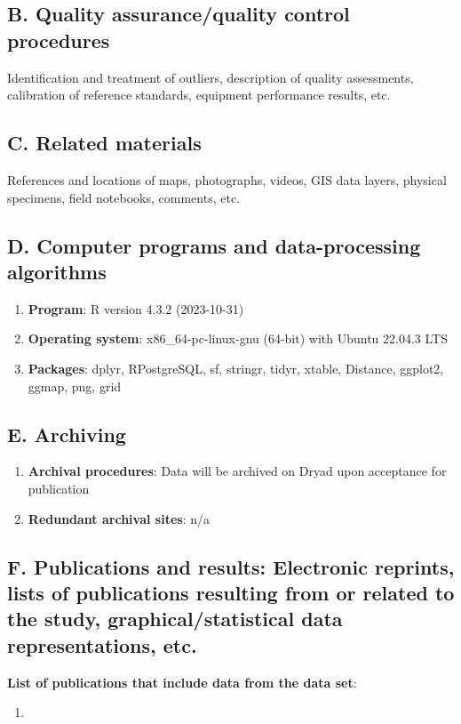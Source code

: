 \documentclass[a4paper,twoside,10pt]{article}
\begin{document}
    \subsection*{B. Quality assurance/quality control procedures}Identification and treatment of outliers, description of quality assessments, calibration of reference standards, equipment performance results, etc.
    \subsection*{C. Related materials} References and locations of maps, photographs, videos, GIS data layers, physical specimens, field notebooks, comments, etc.
    \subsection*{D. Computer programs and data-processing algorithms}
    		\begin{enumerate}
    			\item \textbf{Program}: R version 4.3.2 (2023-10-31)
    			\item \textbf{Operating system}: x86\_64-pc-linux-gnu (64-bit) with Ubuntu 22.04.3 LTS
    			\item \textbf{Packages}: dplyr, RPostgreSQL, sf, stringr, tidyr, xtable, Distance, ggplot2, ggmap, png, grid
    		\end{enumerate}
    \subsection*{E. Archiving}
    		\begin{enumerate}
    		 \item \textbf{Archival procedures}: Data will be archived on Dryad upon acceptance for publication
        	 \item \textbf{Redundant archival sites}: n/a
    		\end{enumerate}
       
    \subsection*{F. Publications and results: Electronic reprints, lists of publications resulting from or related to the study, graphical/statistical data representations, etc.}
\textbf{List of publications that include data from the data set}:
		\begin{enumerate}
			\item 
		\end{enumerate}
    
\end{document}
